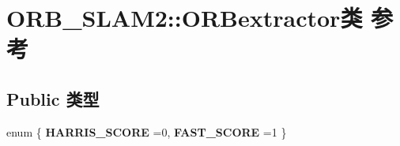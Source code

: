 \hypertarget{classORB__SLAM2_1_1ORBextractor}{\section{O\-R\-B\-\_\-\-S\-L\-A\-M2\-:\-:O\-R\-Bextractor类 参考}
\label{classORB__SLAM2_1_1ORBextractor}
}
\subsection*{Public 类型}
\begin{DoxyCompactItemize}
\item 
enum \{ {\bfseries H\-A\-R\-R\-I\-S\-\_\-\-S\-C\-O\-R\-E} =0, 
{\bfseries F\-A\-S\-T\-\_\-\-S\-C\-O\-R\-E} =1
 \}
\end{DoxyCompactItemize}
